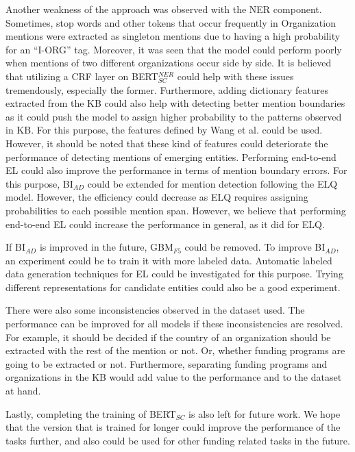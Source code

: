 \documentclass{report}
\theoremstyle{definition}
\theoremstyle{remark}
\begin{document}
Another weakness of the approach was observed with the NER component. Sometimes, stop words and other tokens that occur frequently in Organization mentions were extracted as singleton mentions due to having a high probability for an ``I-ORG'' tag. Moreover, it was seen that the model could perform poorly when mentions of two different organizations occur side by side. It is believed that utilizing a CRF layer on BERT$^{NER}_{SC}$ could help with these issues tremendously, especially the former. Furthermore, adding dictionary features extracted from the KB could also help with detecting better mention boundaries as it could push the model to assign higher probability to the patterns observed in KB. For this purpose, the features defined by Wang et al. \cite{MedDict} could be used. However, it should be noted that these kind of features could deteriorate the performance of detecting mentions of emerging entities. Performing end-to-end EL could also improve the performance in terms of mention boundary errors. For this purpose, BI$_{AD}$ could be extended for mention detection following the ELQ model. However, the efficiency could decrease as ELQ requires assigning probabilities to each possible mention span. However, we believe that performing end-to-end EL could increase the performance in general, as it did for ELQ.

If BI$_{AD}$ is improved in the future, GBM$_{F5}$ could be removed. To improve BI$_{AD}$, an experiment could be to train it with more labeled data. Automatic labeled data generation techniques for EL could be investigated for this purpose. Trying different representations for candidate entities could also be a good experiment. 

There were also some inconsistencies observed in the dataset used. The performance can be improved for all models if these inconsistencies are resolved. For example, it should be decided if the country of an organization should be extracted with the rest of the mention or not. Or, whether funding programs are going to be extracted or not. Furthermore, separating funding programs and organizations in the KB would add value to the performance and to the dataset at hand.

Lastly, completing the training of BERT$_{SC}$ is also left for future work. We hope that the version that is trained for longer could improve the performance of the tasks further, and also could be used for other funding related tasks in the future.



\end{document}
